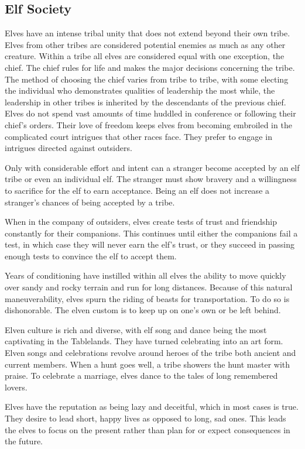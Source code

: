 \subsection{Elf Society}
Elves have an intense tribal unity that does not extend beyond their own tribe. Elves from other tribes are considered potential enemies as much as any other creature. Within a tribe all elves are considered equal with one exception, the chief. The chief rules for life and makes the major decisions concerning the tribe. The method of choosing the chief varies from tribe to tribe, with some electing the individual who demonstrates qualities of leadership the most while, the leadership in other tribes is inherited by the descendants of the previous chief. Elves do not spend vast amounts of time huddled in conference or following their chief's orders. Their love of freedom keeps elves from becoming embroiled in the complicated court intrigues that other races face. They prefer to engage in intrigues directed against outsiders.

Only with considerable effort and intent can a stranger become accepted by an elf tribe or even an individual elf. The stranger must show bravery and a willingness to sacrifice for the elf to earn acceptance. Being an elf does not increase a stranger's chances of being accepted by a tribe.

When in the company of outsiders, elves create tests of trust and friendship constantly for their companions. This continues until either the companions fail a test, in which case they will never earn the elf's trust, or they succeed in passing enough tests to convince the elf to accept them.

Years of conditioning have instilled within all elves the ability to move quickly over sandy and rocky terrain and run for long distances. Because of this natural maneuverability, elves spurn the riding of beasts for transportation. To do so is dishonorable. The elven custom is to keep up on one's own or be left behind.

Elven culture is rich and diverse, with elf song and dance being the most captivating in the Tablelands. They have turned celebrating into an art form. Elven songs and celebrations revolve around heroes of the tribe both ancient and current members. When a hunt goes well, a tribe showers the hunt master with praise. To celebrate a marriage, elves dance to the tales of long remembered lovers.

Elves have the reputation as being lazy and deceitful, which in most cases is true. They desire to lead short, happy lives as opposed to long, sad ones. This leads the elves to focus on the present rather than plan for or expect consequences in the future.

